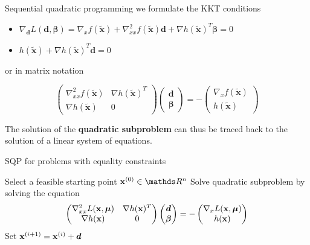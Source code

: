 \documentclass[11pt,compress,t,notes=noshow, xcolor=table]{beamer}
\begin{document}
\begin{vbframe}{Sequential quadratic programming}
we formulate the KKT conditions

\begin{itemize}
\item $\nabla_{\bm{d}} L(\bm{d}, \bm{\beta}) = \nabla_{x} f(\bm{\tilde x}) + \nabla^2_{xx} f(\bm{\tilde x}) \bm{d} + \nabla h(\bm{\tilde x})^T\bm{\beta} = 0$
\item $h(\bm{\tilde x}) + \nabla h(\bm{\tilde x})^T\bm{d} = 0$
\end{itemize}

or in matrix notation

$$
\begin{pmatrix} \nabla^2_{xx} f(\bm{\tilde x}) & \nabla h(\bm{\tilde x})^T \\ \nabla h(\bm{\tilde x}) & 0 \end{pmatrix} \begin{pmatrix} \bm{d} \\ \bm{\beta} \end{pmatrix} = - \begin{pmatrix} \nabla_{x} f(\bm{\tilde x}) \\ h(\bm{\tilde x}) \end{pmatrix}
$$

The solution of the \textbf{quadratic subproblem} can thus be traced back to the solution of a linear system of equations.


\framebreak

\begin{algorithm}[H]
  \caption{SQP for problems with equality constraints}
  \begin{algorithmic}[1]
  \State Select a feasible starting point $\mathbf{x}^{(0)} \in \R^n$
    \State Solve quadratic subproblem by solving the equation
    $$\begin{pmatrix} \nabla^2_{xx} L(\mathbf{x}, \bm{\mu}) & \nabla h(\mathbf{x})^T \\ \nabla h(\mathbf{x}) & 0 \end{pmatrix} \begin{pmatrix} \bm{d} \\ \bm{\beta} \end{pmatrix} = - \begin{pmatrix} \nabla_{x} L(\mathbf{x}, \bm{\mu}) \\ h(\mathbf{x}) \end{pmatrix}$$
    \State Set $\mathbf{x}^{(i + 1)} = \mathbf{x}^{(i)} + \bm{d}$
  \EndWhile
  \end{algorithmic}
\end{algorithm}


\end{vbframe}
\end{document}
